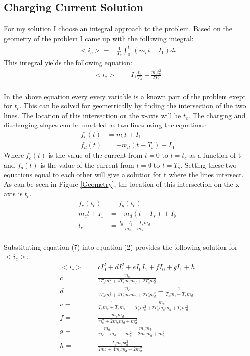 \documentclass[10pt]{article}
\begin{document}
\subsection{Charging Current Solution}
\paragraph{}
For my solution I choose an integral approach to the problem. Based on the geometry of the problem I came up with the following integral: 
\begin{align}
    <i_c> = & \frac{1}{T_s}\int_0^{t_c}(m_ct+I_1)dt
\end{align}
This integral yields the following equation:
\begin{align}
    <i_c> = & I_1\frac{t_c}{T_s}+\frac{m_ct_c^2}{2T_s}
\end{align}
\paragraph{}
In the above equation every every variable is a known part of the problem exept for \(t_c\). This can be solved for geometrically by finding the intersection of the two lines. The location of this intersection on the x-axis will be \(t_c\). The charging and discharging slopes can be modeled as two lines using the equations:
\begin{align}
    f_c(t) & = m_ct+I_1\\
    f_d(t) & = -m_d(t-T_s)+I_0
\end{align}
Where \(f_c(t)\) is the value of the current from \(t = 0\) to \(t = t_c\) as a function of t and \(f_d(t)\) is the value of the current from \(t = 0\) to \(t = T_s\). Setting these two equations equal to each other will give a solution for t where the lines intersect. As can be seen in Figure \ref{Geometry}, the location of this intersection on the x-axis is \(t_c\).
\begin{align}
    f_c(t_c) & = f_d(t_c)\\
    m_ct+I_1 & = -m_d(t-T_s)+I_0\\
    t_c & = \frac{I_0-I_1+T_sm_d}{m_c+m_d}
\end{align}
\paragraph{}
Substituting equation (7) into equation (2) provides the following solution for \(<i_c>\):
\begin{align}
    <i_c> = & cI_0^2+dI_1^2+eI_0I_1+fI_0+gI_1+h\nonumber\\
    c = & \frac{m_c}{2T_sm_c^2+4T_sm_cm_d+2T_sm_d^2}\nonumber\\
    d = & \frac{m_c}{2T_sm_c^2+4T_sm_cm_d+2T_sm_d^2}-\frac{1}{T_sm_c+T_sm_d}\nonumber\\
    e = & \frac{1}{T_sm_c+T_sm_d}-\frac{m_c}{T_sm_c^2+2T_sm_cm_d+T_sm_d^2}\nonumber\\
    f = & \frac{m_cm_d}{m_c^2+2m_cm_d+m_d^2}\nonumber\\
    g = & \frac{m_d}{m_c+m_d}-\frac{m_cm_d}{m_c^2+2m_cm_d+m_d^2}\nonumber\\
    h = & \frac{T_sm_cm_d^2}{2m_c^2+4m_cm_d+2m_d^2}
\end{align}
\end{document}
